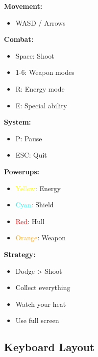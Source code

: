 \documentclass[11pt,a4paper]{article}
\begin{document}
\begin{tcolorbox}[mybox, title=\textbf{Quick Reference}]
\begin{multicols}{2}
\textbf{Movement:}
\begin{itemize}[nosep]
    \item WASD / Arrows
\end{itemize}

\textbf{Combat:}
\begin{itemize}[nosep]
    \item Space: Shoot
    \item 1-6: Weapon modes
    \item R: Energy mode
    \item E: Special ability
\end{itemize}

\textbf{System:}
\begin{itemize}[nosep]
    \item P: Pause
    \item ESC: Quit
\end{itemize}

\columnbreak

\textbf{Powerups:}
\begin{itemize}[nosep]
    \item \textcolor{yellow}{Yellow}: Energy
    \item \textcolor{cyan}{Cyan}: Shield
    \item \textcolor{red}{Red}: Hull
    \item \textcolor{orange}{Orange}: Weapon
\end{itemize}

\textbf{Strategy:}
\begin{itemize}[nosep]
    \item Dodge > Shoot
    \item Collect everything
    \item Watch your heat
    \item Use full screen
\end{itemize}
\end{multicols}
\end{tcolorbox}

\subsection{Keyboard Layout}
\end{document}
